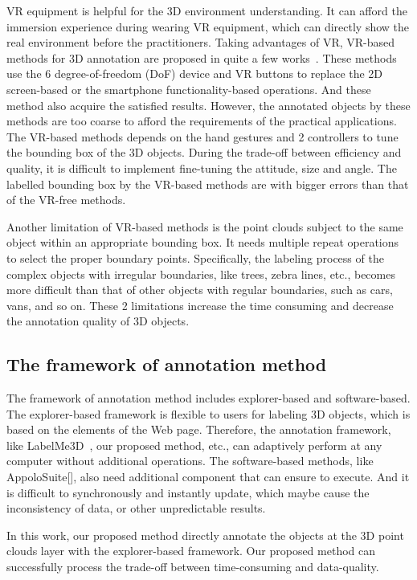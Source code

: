 \documentclass[letterpaper, 10 pt, conference]{ieeeconf}  %
\begin{document}
VR equipment is helpful for the 3D environment understanding. It can afford the immersion experience during wearing VR equipment, which can directly show the real environment before the practitioners. Taking advantages of VR, VR-based methods for 3D annotation are proposed in quite a few works~\cite{pointatme,wilkes20123dVR,coffey2011interactiveVR}. These methods use the 6 degree-of-freedom (DoF) device and VR buttons to replace the 2D screen-based or the smartphone functionality-based operations. And these method also acquire the satisfied results. However, the annotated objects by these methods are too coarse to afford the requirements of the practical applications. The VR-based methods depends on the hand gestures and 2 controllers to tune the bounding box of the 3D objects. During the trade-off between efficiency and quality, it is difficult to implement fine-tuning the attitude, size and angle.  The labelled bounding box by the VR-based methods are with bigger errors than that of the VR-free methods.


Another limitation of VR-based methods is the point clouds subject to the same object within an appropriate bounding box.
It needs multiple repeat operations to select the proper boundary points.
Specifically, the labeling process of the complex objects with irregular boundaries, like trees, zebra lines, etc., becomes more difficult than that of other objects with regular boundaries, such as cars, vans, and so on.
These 2 limitations increase the time consuming and decrease the annotation quality of 3D objects.
\subsection{The framework of annotation method}
The framework of annotation method includes explorer-based and software-based. The explorer-based framework is flexible to users for labeling 3D objects, which is based on the elements of the Web page. Therefore, the annotation framework, like LabelMe3D~\cite{LabelMe3D}, our proposed method, etc., can adaptively perform at any computer without additional operations. The software-based methods, like AppoloSuite[], also need additional component that can ensure to execute. And it is difficult to synchronously and instantly update, which maybe cause the inconsistency of data, or other unpredictable results.

In this work, our proposed method directly annotate the objects at the 3D point clouds layer with the explorer-based framework. Our proposed method can successfully process the trade-off between time-consuming and data-quality.
\end{document}

